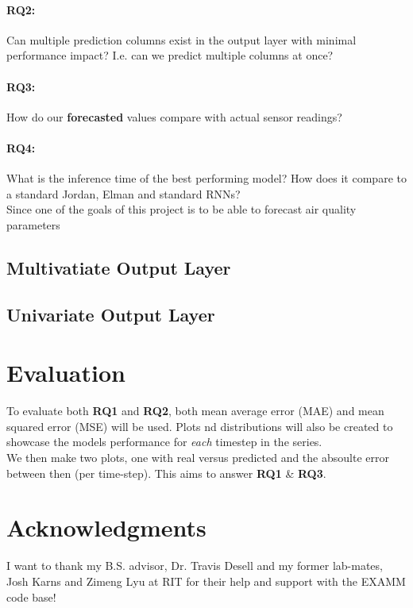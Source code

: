 \documentclass[12pt]{article}
\begin{document}
\paragraph{RQ2:} Can multiple prediction columns exist in the output layer with minimal performance impact? I.e. can we predict multiple columns at once? \\
\paragraph{RQ3:} How do our \textbf{forecasted} values compare with actual sensor readings?\\
\paragraph{RQ4:} What is the inference time of the best performing model? How does it compare to a standard Jordan, Elman and standard RNNs? \\
Since one of the goals of this project is to be able to forecast air quality parameters
\subsection{Multivatiate Output Layer}
\subsection{Univariate Output Layer}


\section{Evaluation}
To evaluate both \textbf{RQ1} and \textbf{RQ2}, both mean average error (MAE) and mean squared error (MSE) will be used. Plots nd distributions will also be created to showcase the models performance for \textit{each} timestep in the series.\\
We then make two plots, one with real versus predicted and the absoulte error between then (per time-step).
This aims to answer \textbf{RQ1} \& \textbf{RQ3}.

\section{Acknowledgments}
I want to thank my B.S. advisor, Dr. Travis Desell and my former lab-mates, Josh Karns and Zimeng Lyu at RIT for their help and support with the EXAMM code base!

\end{document}
